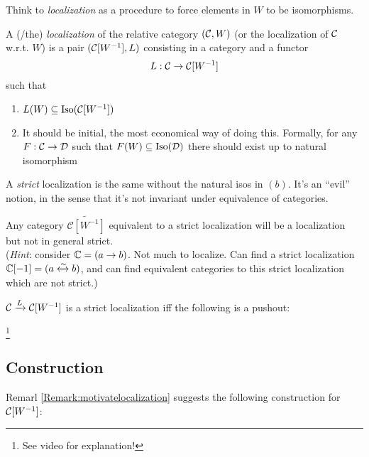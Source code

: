 \documentclass[class=report, crop=false,a4paper,twoside]{standalone}
\begin{document}
Think to \emph{localization} as a procedure to force elements in $W$ to be isomorphisms.
\begin{definition}
	A (/the) \emph{localization} of the relative category $(\mathcal{C},W)$ (or the localization of $\mathcal{C}$ w.r.t. $W$) is a pair $(\mathcal{C}[W^{-1}] , L)$ consisting in a category and a functor
	\[
	L: \mathcal{C} \to \mathcal{C}[W^{-1}]
	\]
	such that
	\begin{enumerate}
		\item $L(W) \subseteq \operatorname{Iso}(\mathcal{C}[W^{-1}])$
		\item It should be initial, the most economical way of doing this. Formally, for any $F: \mathcal{C} \to \mathcal{D}$ such that $F(W) \subseteq \operatorname{Iso}(\mathcal{D})$ there should exist up to natural isomorphism
		\begin{center}
		\end{center}
	\end{enumerate}
	A \emph{strict} localization is the same without the natural isos in $(b)$. It's an ``evil'' notion, in the sense that it's not invariant under equivalence of categories.
\end{definition}

	\begin{exercise}
	Any category $\widetilde{\mathcal{C}[W^{-1}]}$ equivalent to a strict localization will be a localization but not in general strict.
	\\
	(\emph{Hint}: consider $\mathbb{C} = (a \to b)$. Not much to localize. Can find a strict localization $\mathbb{C}[-1] = (a \xleftrightarrow{\sim} b)$, and can find equivalent categories to this strict localization which are not strict.)
	\end{exercise}

\begin{remark}\label{Remark:motivatelocalization}
	$\mathcal{C} \xrightarrow{L} \mathcal{C}[W^{-1}]$ is a strict localization iff the following is a pushout:
	
	\footnote{See video for explanation!}
\end{remark}

\subsection{Construction}
Remarl \ref{Remark:motivatelocalization} suggests the following construction for $\mathcal{C}[W^{-1}]$:
\end{document}
